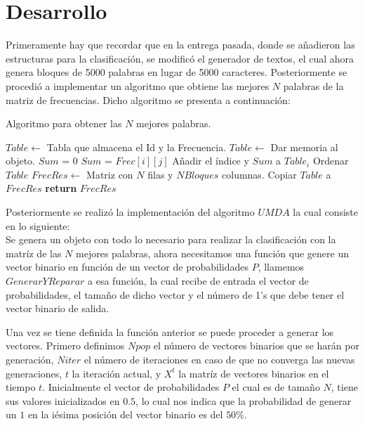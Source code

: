 \documentclass[12pt]{article}
\begin{document}
\section{Desarrollo}
Primeramente hay que recordar que en la entrega pasada, donde se añadieron las estructuras para la clasificación, se modificó el generador de textos, el cual ahora genera bloques de 5000 palabras en lugar de 5000 caracteres. Posteriormente se procedió a implementar un algoritmo que obtiene las mejores $N$ palabras de la matriz de frecuencias. Dicho algoritmo se presenta a continuación:\\

\begin{algorithm}[H]
\caption{Algoritmo para obtener las $N$ mejores palabras.}
\begin{algorithmic}[1]
\State $Table\gets$ Tabla que almacena el Id y la Frecuencia.
\State $Table\gets$ Dar memoria al objeto.
\State $Sum$ = $0$
\State $Sum$ = $Frec[i][j]$
\EndFor
\State Añadir el índice y $Sum$ a $Table_i$
\EndFor
\State Ordenar $Table$
\State $FrecRes\gets$ Matriz con $N$ filas y $NBloques$ columnas.
\State Copiar $Table$ a $FrecRes$
\State \textbf{return} $FrecRes$
\EndProcedure
\end{algorithmic}
\end{algorithm}

Posteriormente se realizó la implementación del algoritmo $UMDA$ la cual consiste en lo siguiente:\\
Se genera un objeto con todo lo necesario para realizar la clasificación con la matríz de las $N$ mejores palabras, ahora necesitamos una función que genere un vector binario en función de un vector de probabilidades $P$, llamemos $GenerarYReparar$ a esa función, la cual recibe de entrada el vector de probabilidades, el tamaño de dicho vector y el número de 1's que debe tener el vector binario de salida. 

Una vez se tiene definida la función anterior se puede proceder a generar los vectores. Primero definimos $Npop$ el número de vectores binarios que se harán por generación, $Niter$ el número de iteraciones en caso de que no converga las nuevas generaciones, $t$ la iteración actual, y $X^t$ la matríz de vectores binarios en el tiempo $t$. Inicialmente el vector de probabilidades $P$ el cual es de tamaño $N$, tiene sus valores inicializados en $0.5$, lo cual nos indica que la probabilidad de generar un $1$ en la iésima posición del vector binario es del $50\%$.\\
\end{document}
